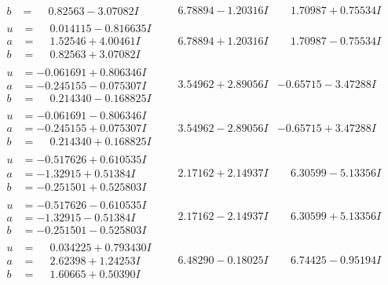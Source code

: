 \documentclass[1p]{elsarticle_modified}
\theoremstyle{definition}
\begin{document}
$$\begin{array}{c|c|c}
\begin{aligned}
b &= \phantom{-}0.82563 - 3.07082 I\end{aligned}
 & \phantom{-}6.78894 - 1.20316 I & \phantom{-}1.70987 + 0.75534 I \\ \hline\begin{aligned}
u &= \phantom{-}0.014115 - 0.816635 I \\
a &= \phantom{-}1.52546 + 4.00461 I \\
b &= \phantom{-}0.82563 + 3.07082 I\end{aligned}
 & \phantom{-}6.78894 + 1.20316 I & \phantom{-}1.70987 - 0.75534 I \\ \hline\begin{aligned}
u &= -0.061691 + 0.806346 I \\
a &= -0.245155 - 0.075307 I \\
b &= \phantom{-}0.214340 - 0.168825 I\end{aligned}
 & \phantom{-}3.54962 + 2.89056 I & -0.65715 - 3.47288 I \\ \hline\begin{aligned}
u &= -0.061691 - 0.806346 I \\
a &= -0.245155 + 0.075307 I \\
b &= \phantom{-}0.214340 + 0.168825 I\end{aligned}
 & \phantom{-}3.54962 - 2.89056 I & -0.65715 + 3.47288 I \\ \hline\begin{aligned}
u &= -0.517626 + 0.610535 I \\
a &= -1.32915 + 0.51384 I \\
b &= -0.251501 + 0.525803 I\end{aligned}
 & \phantom{-}2.17162 + 2.14937 I & \phantom{-}6.30599 - 5.13356 I \\ \hline\begin{aligned}
u &= -0.517626 - 0.610535 I \\
a &= -1.32915 - 0.51384 I \\
b &= -0.251501 - 0.525803 I\end{aligned}
 & \phantom{-}2.17162 - 2.14937 I & \phantom{-}6.30599 + 5.13356 I \\ \hline\begin{aligned}
u &= \phantom{-}0.034225 + 0.793430 I \\
a &= \phantom{-}2.62398 + 1.24253 I \\
b &= \phantom{-}1.60665 + 0.50390 I\end{aligned}
 & \phantom{-}6.48290 - 0.18025 I & \phantom{-}6.74425 - 0.95194 I \\ \hline\begin{aligned}

\end{aligned}
\end{array}$$
\end{document}
